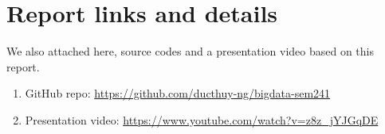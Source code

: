 \documentclass[12pt, a4paper]{article}
\begin{document}
\pagebreak
\section{Report links and details}
We also attached here, source codes and a presentation video based on this report.

\begin{enumerate}
    \item GitHub repo: \url{https://github.com/ducthuy-ng/bigdata-sem241}
    \item Presentation video: \url{https://www.youtube.com/watch?v=z8z_jYJGqDE}
\end{enumerate}

\pagebreak



\nocite{*}
\end{document}
